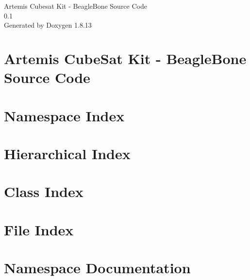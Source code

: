 \documentclass[twoside]{book}
\newcommand{\+}{\discretionary{\mbox{\scriptsize$\hookleftarrow$}}{}{}}
\newcommand{\clearemptydoublepage}{%
  \newpage{\pagestyle{empty}\cleardoublepage}%
}
\begin{document}
\hypersetup{pageanchor=false,
             bookmarksnumbered=true,
             pdfencoding=unicode
            }
\begin{titlepage}
\vspace*{7cm}
\begin{center}%
{\Large Artemis Cubesat Kit -\/ Beagle\+Bone Source Code \\[1ex]\large 0.\+1 }\\
\vspace*{1cm}
{\large Generated by Doxygen 1.8.13}\\
\end{center}
\end{titlepage}
\clearemptydoublepage
{}
\tableofcontents
\clearemptydoublepage
{}
\hypersetup{pageanchor=true}

\chapter{Artemis Cube\+Sat Kit -\/ Beagle\+Bone Source Code}
\label{index}\hypertarget{index}{}
\chapter{Namespace Index}

\chapter{Hierarchical Index}

\chapter{Class Index}

\chapter{File Index}

\chapter{Namespace Documentation}



\end{document}
